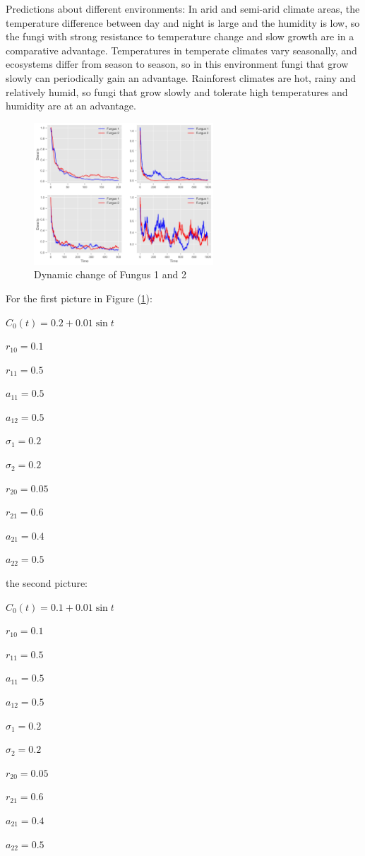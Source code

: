 Predictions about different environments: In arid and semi-arid climate areas, the temperature difference between day and night is large and the humidity is low, so the fungi with strong resistance to temperature change and slow growth are in a comparative advantage. Temperatures in temperate climates vary seasonally, and ecosystems differ from season to season, so in this environment fungi that grow slowly can periodically gain an advantage. Rainforest climates are hot, rainy and relatively humid, so fungi that grow slowly and tolerate high temperatures and humidity are at an advantage.
\begin{figure}[H]
    \centering
    \includegraphics[width=0.6\textwidth]{./code/fig8.jpg}
    \caption{Dynamic change of Fungus 1 and 2}\label{fig8}
\end{figure}

For the first picture in Figure (\ref{fig8}):

$C_{0}(t)=0.2+0.01\sin t$

\begin{multicols}{5}
    $r_{10}=0.1$
    
    $r_{11}=0.5$
    
    $a_{11}=0.5$
    
    $a_{12}=0.5$
    
    $\sigma_{1}=0.2$

    $\sigma_{2}=0.2$
    
    $r_{20}=0.05$
    
    $r_{21}=0.6$
    
    $a_{21}=0.4$
    
    $a_{22}=0.5$

\end{multicols}

the second picture:

$C_{0}(t)=0.1+0.01\sin t$

\begin{multicols}{5}
    $r_{10}=0.1$
    
    $r_{11}=0.5$
    
    $a_{11}=0.5$
    
    $a_{12}=0.5$
    
    $\sigma_{1}=0.2$

    $\sigma_{2}=0.2$
    
    $r_{20}=0.05$
    
    $r_{21}=0.6$
    
    $a_{21}=0.4$
    
    $a_{22}=0.5$

\end{multicols}

